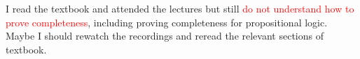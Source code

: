 I read the textbook and attended the lectures but still \textcolor{red}{do not understand how to prove completeness}, including proving completeness for propositional logic. Maybe I should rewatch the recordings and reread the relevant sections of textbook.
